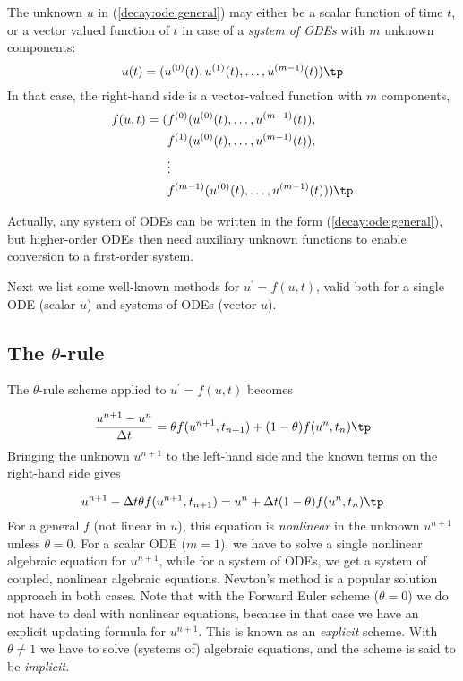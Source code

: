 \documentclass[graybox,sectrefs,envcountresetchap,open=right,final]{svmonodo}
\begin{document}
The unknown $u$ in (\ref{decay:ode:general}) may either be
a scalar function of time $t$, or a vector valued function of $t$ in
case of a \emph{system of ODEs} with $m$ unknown components:
\[ u(t) = (u^{(0)}(t),u^{(1)}(t),\ldots,u^{(m-1)}(t)) \tp  \]
In that case, the right-hand side is a vector-valued function with $m$
components,
\begin{align*}
f(u, t) = ( & f^{(0)}(u^{(0)}(t),\ldots,u^{(m-1)}(t)),\\ 
            & f^{(1)}(u^{(0)}(t),\ldots,u^{(m-1)}(t)),\\ 
            & \vdots\\ 
            & f^{(m-1)}(u^{(0)}(t),\ldots,u^{(m-1)}(t)))
\tp
\end{align*}

Actually, any system of ODEs can
be written in the form (\ref{decay:ode:general}), but higher-order
ODEs then need auxiliary unknown functions to enable conversion to
a first-order system.


Next we list some well-known methods for $u^{\prime}=f(u,t)$, valid both for
a single ODE (scalar $u$) and systems of ODEs (vector $u$).


\subsection{The $\theta$-rule}

The $\theta$-rule scheme applied to $u^{\prime}=f(u,t)$ becomes

\begin{equation}
\frac{u^{n+1}-u^n}{\Delta t} = \theta f(u^{n+1},t_{n+1}) +
(1-\theta)f(u^n, t_n)\tp
\label{decay:fd2:theta}
\end{equation}
Bringing the unknown $u^{n+1}$ to the left-hand side and the known terms
on the right-hand side gives

   

\begin{equation}
u^{n+1} - \Delta t \theta f(u^{n+1},t_{n+1}) =
u^n + \Delta t(1-\theta)f(u^n, t_n)\tp
\end{equation}
For a general $f$ (not linear in $u$), this equation is \emph{nonlinear} in
the unknown $u^{n+1}$ unless $\theta = 0$. For a scalar ODE ($m=1$),
we have to solve a single nonlinear algebraic equation for $u^{n+1}$,
while for a system of ODEs, we get a system of coupled, nonlinear
algebraic equations. Newton's method is a popular solution approach
in both cases. Note that with the Forward Euler scheme ($\theta =0$)
we do not have to deal with nonlinear equations, because in that
case we have an explicit updating formula for $u^{n+1}$. This is known
as an \emph{explicit} scheme. With $\theta\neq 1$ we have to solve
(systems of) algebraic equations, and the scheme is said to be \emph{implicit}.
\end{document}
